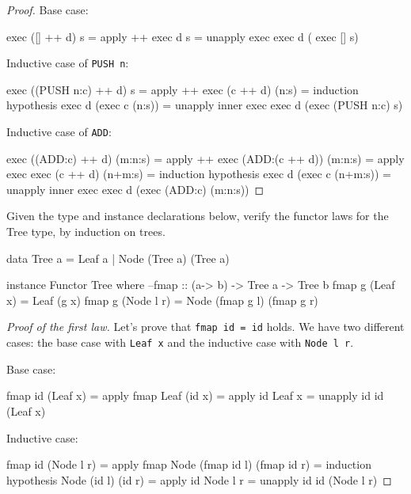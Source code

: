 \documentclass[12pt]{article}
\newenvironment{code}{\endgraf\verbatim}{\endverbatim}
\newenvironment{problem}[2][Problem]{\begin{trivlist}
\item[\hskip \labelsep {\bfseries #1}\hskip \labelsep {\bfseries #2.}]}{\end{trivlist}}
\begin{document}
\begin{proof}
Base case:

\begin{code}
  exec ([] ++ d) s
=   { apply ++ }
  exec d s
=   { unapply exec }
  exec d ( exec [] s)
\end{code}

Inductive case of \verb|PUSH n|:

\begin{code}
  exec ((PUSH n:c) ++ d) s
=   { apply ++ }
  exec (c ++ d) (n:s)
=   { induction hypothesis }
  exec d (exec c (n:s))
=   { unapply inner exec }
  exec d (exec (PUSH n:c) s)
\end{code}

Inductive case of \verb|ADD|:

\begin{code}
  exec ((ADD:c) ++ d) (m:n:s)
=   { apply ++ }
  exec (ADD:(c ++ d)) (m:n:s)
=   { apply exec }
  exec (c ++ d) (n+m:s)
=   { induction hypothesis }
  exec d (exec c (n+m:s))
=   { unapply inner exec }
  exec d (exec (ADD:c) (m:n:s))
\end{code}
\end{proof}


\begin{problem}{3}
Given the type and instance declarations below, verify the functor laws for the Tree type, by induction on trees.

\begin{code}
data Tree a = Leaf a | Node (Tree a) (Tree a)

instance Functor Tree where
    --fmap :: (a-> b) -> Tree a -> Tree b
    fmap g (Leaf x) = Leaf (g x)
    fmap g (Node l r) = Node (fmap g l) (fmap g r)
\end{code}
\end{problem}

\begin{proof}[Proof of the first law]
Let's prove that \verb|fmap id = id| holds. We have two different cases: the base case with \verb|Leaf x| and the inductive case with \verb|Node l r|.

Base case:

\begin{code}
  fmap id (Leaf x)
=   { apply fmap }
  Leaf (id x)
=   { apply id }
  Leaf x
=   { unapply id }
  id (Leaf x)
\end{code}

Inductive case:

\begin{code}
  fmap id (Node l r)
=   { apply fmap }
  Node (fmap id l) (fmap id r)
=   { induction hypothesis }
  Node (id l) (id r)
=   { apply id }
  Node l r
=   { unapply id }
  id (Node l r)
\end{code}
\end{proof}
\end{document}
